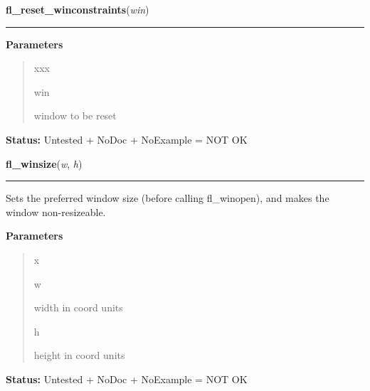 \hspace{.8\funcindent}\begin{boxedminipage}{\funcwidth}

    \raggedright \textbf{fl\_reset\_winconstraints}(\textit{win})

    \vspace{-1.5ex}

    \rule{\textwidth}{0.5\fboxrule}
\setlength{\parskip}{2ex}
\setlength{\parskip}{1ex}
      \textbf{Parameters}
      \vspace{-1ex}

      \begin{quote}
        \begin{Ventry}{xxx}

          \item[win]

          window to be reset

        \end{Ventry}

      \end{quote}

\textbf{Status:} Untested + NoDoc + NoExample = NOT OK



    \end{boxedminipage}

    \label{xformslib:library:fl_winsize}

    \vspace{0.5ex}

\hspace{.8\funcindent}\begin{boxedminipage}{\funcwidth}

    \raggedright \textbf{fl\_winsize}(\textit{w}, \textit{h})

    \vspace{-1.5ex}

    \rule{\textwidth}{0.5\fboxrule}
\setlength{\parskip}{2ex}
    Sets the preferred window size (before calling fl\_winopen), and makes 
    the window non-resizeable.

\setlength{\parskip}{1ex}
      \textbf{Parameters}
      \vspace{-1ex}

      \begin{quote}
        \begin{Ventry}{x}

          \item[w]

          width in coord units

          \item[h]

          height in coord units

        \end{Ventry}

      \end{quote}

\textbf{Status:} Untested + NoDoc + NoExample = NOT OK



    \end{boxedminipage}

